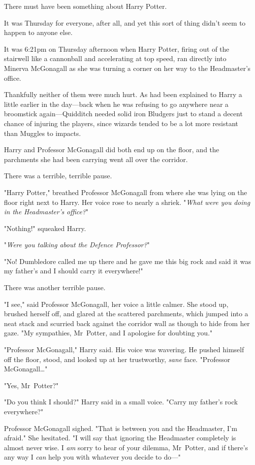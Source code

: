 There must have been something about Harry Potter.

It was Thursday for everyone, after all, and yet this sort of thing didn’t seem
to happen to anyone else.

It was 6:21pm on Thursday afternoon when Harry Potter, firing out of the
stairwell like a cannonball and accelerating at top speed, ran directly into
Minerva McGonagall as she was turning a corner on her way to the Headmaster’s
office.

Thankfully neither of them were much hurt. As had been explained to Harry a
little earlier in the day—back when he was refusing to go anywhere near a
broomstick again—Quidditch needed solid iron Bludgers just to stand a decent
chance of injuring the players, since wizards tended to be a lot more resistant
than Muggles to impacts.

Harry and Professor McGonagall did both end up on the floor, and the parchments
she had been carrying went all over the corridor.

There was a terrible, terrible pause.

"Harry Potter," breathed Professor McGonagall from where she was lying on the
floor right next to Harry. Her voice rose to nearly a shriek. "\emph{What were
you doing in the Headmaster’s office?}"

"Nothing!" squeaked Harry.

"\emph{Were you talking about the Defence Professor?}"

"No! Dumbledore called me up there and he gave me this big rock and said it was
my father’s and I should carry it everywhere!"

There was another terrible pause.

"I see," said Professor McGonagall, her voice a little calmer. She stood up,
brushed herself off, and glared at the scattered parchments, which jumped into
a neat stack and scurried back against the corridor wall as though to hide from
her gaze. "My sympathies, Mr~Potter, and I apologise for doubting you."

"Professor McGonagall," Harry said. His voice was wavering. He pushed himself
off the floor, stood, and looked up at her trustworthy, \emph{sane} face.
"Professor McGonagall…"

"Yes, Mr~Potter?"

"Do you think I should?" Harry said in a small voice. "Carry my father’s rock
everywhere?"

Professor McGonagall sighed. "That is between you and the Headmaster, I’m
afraid." She hesitated. "I will say that ignoring the Headmaster completely is
almost never wise. I \emph{am} sorry to hear of your dilemma, Mr~Potter, and
if there’s any way I \emph{can} help you with whatever you decide to do—"

